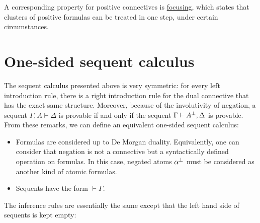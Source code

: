 A corresponding property for positive connectives is
\hyperref[reversibility-and-focusing]{focusing}, which states that
clusters of positive formulas can be treated in one step, under certain
circumstances.

\section{One-sided sequent calculus}\label{one-sided-sequent-calculus}

The sequent calculus presented above is very symmetric: for every left
introduction rule, there is a right introduction rule for the dual
connective that has the exact same structure. Moreover, because of the
involutivity of negation, a sequent \(\Gamma,A\vdash\Delta\) is provable
if and only if the sequent \(\Gamma\vdash A^\bot,\Delta\) is provable.
From these remarks, we can define an equivalent one-sided sequent
calculus:

\begin{itemize}
\item Formulas are considered up to De Morgan duality. Equivalently, one can
  consider that negation is not a connective but a syntactically defined
  operation on formulas. In this case, negated atoms \(\alpha^\bot\)
  must be considered as another kind of atomic formulas.
\item Sequents have the form \(\vdash\Gamma\).
\end{itemize}

The inference rules are essentially the same except that the left hand
side of sequents is kept empty:

